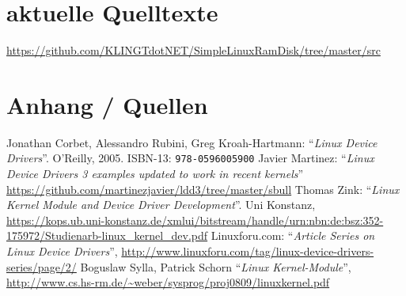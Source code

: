 \section{aktuelle Quelltexte}

\href{SimpleLinuxRamDisk@github}{https://github.com/KLINGTdotNET/SimpleLinuxRamDisk/tree/master/src}

\section{Anhang / Quellen}


\begin{thebibliography}{1}
    Jonathan Corbet, Alessandro Rubini, Greg Kroah-Hartmann:
       \enquote{\sl Linux Device Drivers}. O'Reilly, 2005. ISBN-13: \texttt{978-0596005900}
     Javier Martinez: \enquote{\sl Linux Device Drivers 3 examples updated to work in recent kernels} \url{https://github.com/martinezjavier/ldd3/tree/master/sbull}
    Thomas Zink: \enquote{\sl Linux Kernel Module and Device Driver Development}. Uni Konstanz, \url{https://kops.ub.uni-konstanz.de/xmlui/bitstream/handle/urn:nbn:de:bsz:352-175972/Studienarb-linux_kernel_dev.pdf}
     Linuxforu.com: \enquote{\sl Article Series on Linux Device Drivers}, \url{http://www.linuxforu.com/tag/linux-device-drivers-series/page/2/}
     Boguslaw Sylla, Patrick Schorn \enquote{\sl Linux Kernel-Module}, \url{http://www.cs.hs-rm.de/~weber/sysprog/proj0809/linuxkernel.pdf}
\end{thebibliography}
